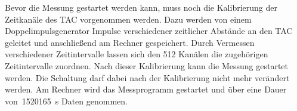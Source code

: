 Bevor die Messung gestartet werden kann, muss noch die Kalibrierung der
Zeitkanäle des TAC vorgenommen werden. Dazu werden von einem
Doppelimpulsgenerator Impulse verschiedener zeitlicher Abstände an den TAC
geleitet und anschließend am Rechner gespeichert. Durch Vermessen verschiedener
Zeitintervalle lassen sich den 512 Kanälen die zugehörigen Zeitintervalle
zuordnen. Nach dieser Kalibrierung kann die Messung gestartet werden. Die
Schaltung darf dabei nach der Kalibrierung nicht mehr verändert werden. Am
Rechner wird das Messprogramm gestartet und über eine Dauer
von~\SI{1520165}{\second} Daten genommen.
